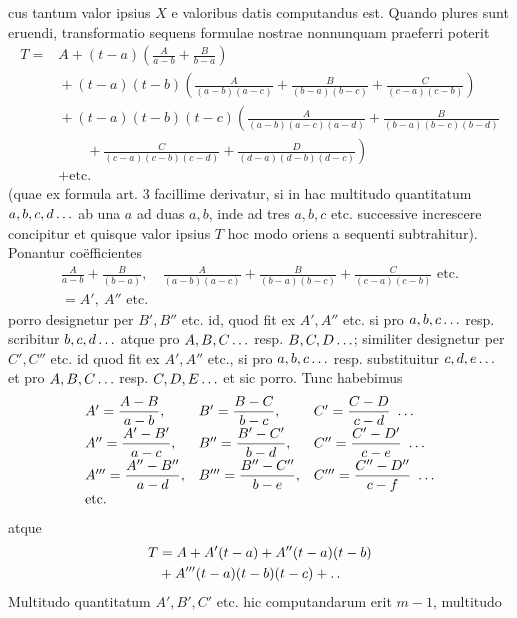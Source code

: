 cus tantum valor ipsius $X$ e valoribus datis computandus est. Quando plures
sunt eruendi, transformatio sequens formulae nostrae nonnunquam praeferri
poterit
\[
\begin{aligned}
T={}&A+(t-a)\left(\frac{A}{a-b}+\frac{B}{b-a}\right)\\
&{}+(t-a)(t-b)\left(\frac{A}{(a-b)(a-c)}+\frac{B}{(b-a)(b-c)}+\frac{C}{(c-a)(c-b)}\right)\\
&{}+(t-a)(t-b)(t-c)\left(\frac{A}{(a-b)(a-c)(a-d)}+\frac{B}{(b-a)(b-c)(b-d)}\right.\\
&\qquad\left.{}+\frac{C}{(c-a)(c-b)(c-d)}+\frac{D}{(d-a)(d-b)(d-c)}\right)\\
&{}+\text{etc.}
\end{aligned}
\]
(quae ex formula art. 3 facillime derivatur, si in hac multitudo quantitatum
$a,b,c,d\mathinner{.\,.\,.}$ ab una $a$ ad duas $a,b$, inde ad tres $a,b,c$ etc. successive increscere
concipitur et quisque valor ipsius $T$ hoc modo oriens a sequenti subtrahitur).
Ponantur coëfficientes
\[
\begin{gathered}\frac{A}{a-b}+\frac{B}{(b-a)},\quad
\frac{A}{(a-b)(a-c)}+\frac{B}{(b-a)(b-c)}+\frac{C}{(c-a)(c-b)}\text{ etc.}\\
=A',\ A''\text{ etc.}\end{gathered}
\]
porro designetur per $B',B''$ etc. id, quod fit ex $A',A''$ etc. si pro $a,b,c\mathinner{.\,.\,.}$
resp. scribitur $b,c,d\mathinner{.\,.\,.}$ atque pro $A,B,C\mathinner{.\,.\,.}$ resp. $B,C,D\mathinner{.\,.\,.}$; similiter designetur per $C',C''$ etc. id quod fit ex $A',A''$ etc., si pro $a,b,c\mathinner{.\,.\,.}$ resp. substituitur $c,d,e\mathinner{.\,.\,.}$ et pro $A,B,C\mathinner{.\,.\,.}$ resp. $C,D,E\mathinner{.\,.\,.}$ et sic porro. Tunc habebimus
\[
\begin{array}{lll}
A'=\dfrac{A-B}{a-b},&B'=\dfrac{B-C}{b-c},&C'=\dfrac{C-D}{c-d}\ \mathinner{.\,.\,.}\\[5pt]
A''=\dfrac{A'-B'}{a-c},&B''=\dfrac{B'-C'}{b-d},&C''=\dfrac{C'-D'}{c-e}\ \mathinner{.\,.\,.}\\[5pt]
A'''=\dfrac{A''-B''}{a-d},&B'''=\dfrac{B''-C''}{b-e},&C'''=\dfrac{C''-D''}{c-f}\ \mathinner{.\,.\,.}\\
\text{etc.}&&
\end{array}
\]
atque
\[\begin{aligned}
T&=A+A'(t-a)+A''(t-a)(t-b)\\&+A'''(t-a)(t-b)(t-c)+\mathinner{.\,.}
\end{aligned}\]
Multitudo quantitatum $A',B',C'$ etc. hic computandarum erit $m-1$, multitudo
